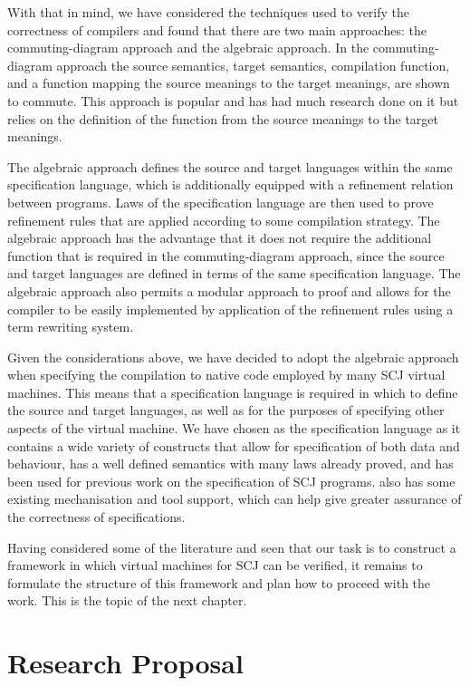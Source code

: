\documentclass[a4paper,10pt]{report}
\begin{document}
With that in mind, we have considered the techniques used to verify
the correctness of compilers and found that there are two main
approaches: the commuting-diagram approach and the algebraic approach.
In the commuting-diagram approach the source semantics, target
semantics, compilation function, and a function mapping the source
meanings to the target meanings, are shown to commute.
This approach is popular and has had much research done on it but
relies on the definition of the function from the source meanings to
the target meanings.

The algebraic approach defines the source and target languages within
the same specification language, which is additionally equipped with a
refinement relation between programs.
Laws of the specification language are then used to prove refinement
rules that are applied according to some compilation strategy.
The algebraic approach has the advantage that it does not require the
additional function that is required in the commuting-diagram
approach, since the source and target languages are defined in terms
of the same specification language.
The algebraic approach also permits a modular approach to proof and
allows for the compiler to be easily implemented by application of the
refinement rules using a term rewriting system.

Given the considerations above, we have decided to adopt the algebraic
approach when specifying the compilation to native code employed by
many SCJ virtual machines.
This means that a specification language is required in which to
define the source and target languages, as well as for the purposes of
specifying other aspects of the virtual machine.
We have chosen \Circus{} as the specification language as it contains
a wide variety of constructs that allow for specification of both data
and behaviour, has a well defined semantics with many laws already
proved, and has been used for previous work on the specification of
SCJ programs.
\Circus{} also has some existing mechanisation and tool support, which
can help give greater assurance of the correctness of specifications.

Having considered some of the literature and seen that our task is to
construct a framework in which virtual machines for SCJ can be
verified, it remains to formulate the structure of this framework and
plan how to proceed with the work.
This is the topic of the next chapter.

\chapter{Research Proposal}
\label{research-proposal-chapter}
\end{document}
